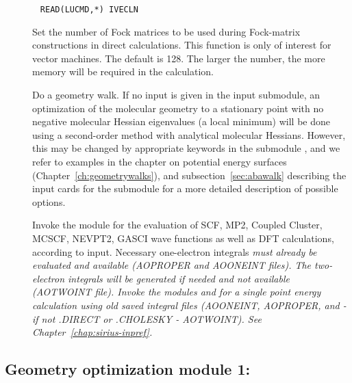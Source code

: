\begin{description}
\item[]\verb| |
\newline
\verb|READ(LUCMD,*) IVECLN|

Set the number of Fock matrices to be used during Fock-matrix constructions in
direct calculations. This function is only of interest for vector machines.
The default is 128. The larger the number, the more memory will be required
in the calculation.

\item[]
Do a geometry walk.
If no input is given in the
 input submodule, an optimization of the molecular
geometry to a stationary point with no negative molecular Hessian eigenvalues (a
local minimum) will be done using a second-order method with
analytical molecular Hessians. However, this may be changed by appropriate
keywords in the submodule , and we refer to examples in
the chapter on potential energy surfaces
(Chapter~\ref{ch:geometrywalks}), and subsection~\ref{sec:abawalk}
describing the input cards for the  submodule for a more
detailed description of possible options.

\item[]
Invoke the {\sir} module for the evaluation of SCF, MP2, Coupled
Cluster, MCSCF, NEVPT2, GASCI wave functions as well as DFT calculations, according to input.
Necessary one-electron integrals \em{must} already be evaluated and available (AOPROPER and AOONEINT files).
The two-electron integrals will be generated if needed and not available (AOTWOINT file).
Invoke the modules {\her} and {\sir} for a single point energy calculation using old saved integral files (AOONEINT, AOPROPER, and - if not .DIRECT or .CHOLESKY - AOTWOINT).
See Chapter~\ref{chap:sirius-inpref}.
\end{description}

%

\subsection{Geometry optimization module 1: }\label{subsec:minimize}

